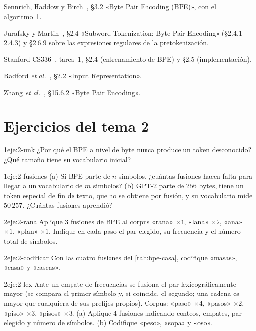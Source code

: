 \begin{lecturas}
\item Sennrich, Haddow y Birch~\cite{sennrich}, §3.2 «Byte Pair Encoding (BPE)», con el algoritmo~1.
\item Jurafsky y Martin~\cite{jm3}, §2.4 «Subword Tokenization: Byte-Pair Encoding» (§2.4.1--2.4.3) y §2.6.9 sobre las expresiones regulares de la pretokenización.
\item Stanford CS336~\cite{cs336}, tarea~1, §2.4 (entrenamiento de BPE) y §2.5 (implementación).
\item Radford \emph{et al.}~\cite{gpt2}, §2.2 «Input Representation».
\item Zhang \emph{et al.}~\cite{d2l}, §15.6.2 «Byte Pair Encoding».
\end{lecturas}

\section*{Ejercicios del tema 2}

\begin{ejercicio}{1}{eje:2-unk}
¿Por qué el BPE a nivel de byte nunca produce un token desconocido? ¿Qué tamaño tiene su vocabulario inicial?
\end{ejercicio}

\begin{ejercicio}{1}{eje:2-fusiones}
(a) Si BPE parte de $n$ símbolos, ¿cuántas fusiones hacen falta para llegar a un vocabulario de $m$ símbolos? (b) GPT-2 parte de 256 bytes, tiene un token especial de fin de texto, que no se obtiene por fusión, y su vocabulario mide $50\,257$. ¿Cuántas fusiones aprendió?
\end{ejercicio}

\begin{ejercicio}{2}{eje:2-rana}
Aplique 3 fusiones de BPE al corpus «rana» $\times 1$, «lana» $\times 2$, «ana» $\times 1$, «plan» $\times 1$. Indique en cada paso el par elegido, su frecuencia y el número total de símbolos.
\end{ejercicio}

\begin{ejercicio}{2}{eje:2-codificar}
Con las cuatro fusiones del \cref{tab:bpe-casa}, codifique «masas», «casa» y «cascas».
\end{ejercicio}

\begin{ejercicio}{2}{eje:2-lex}
Ante un empate de frecuencias se fusiona el par lexicográficamente mayor (se compara el primer símbolo y, si coincide, el segundo; una cadena es mayor que cualquiera de sus prefijos propios). Corpus: «paso» $\times 4$, «pasos» $\times 2$, «piso» $\times 3$, «pisos» $\times 3$. (a) Aplique 4 fusiones indicando conteos, empates, par elegido y número de símbolos. (b) Codifique «peso», «sopa» y «oso».
\end{ejercicio}

